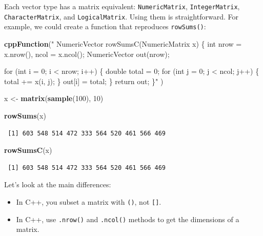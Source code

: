 \documentclass[
]{krantz}
\makeatletter
\newenvironment{Shaded}{\begin{snugshade}}{\end{snugshade}}
\newcommand{\DecValTok}[1]{\textcolor[rgb]{0.06,0.06,0.06}{#1}}
\newcommand{\KeywordTok}[1]{\textcolor[rgb]{0.27,0.27,0.27}{\textbf{#1}}}
\newcommand{\NormalTok}[1]{#1}
\newcommand{\StringTok}[1]{\textcolor[rgb]{0.5,0.5,0.5}{#1}}
\providecommand{\tightlist}{%
  \setlength{\itemsep}{0pt}\setlength{\parskip}{0pt}}
\newenvironment{kframe}{%
\medskip{}
\setlength{\fboxsep}{.8em}
 \def\at@end@of@kframe{}%
 \ifinner\ifhmode%
  \def\at@end@of@kframe{\end{minipage}}%
  \begin{minipage}{\columnwidth}%
 \fi\fi%
 \def\FrameCommand##1{\hskip\@totalleftmargin \hskip-\fboxsep
 \colorbox{shadecolor}{##1}\hskip-\fboxsep
     \hskip-\linewidth \hskip-\@totalleftmargin \hskip\columnwidth}%
 \MakeFramed {\advance\hsize-\width
   \@totalleftmargin\z@ \linewidth\hsize
   \@setminipage}}%
 {\par\unskip\endMakeFramed%
 \at@end@of@kframe}
\renewenvironment{Shaded}{\begin{kframe}}{\end{kframe}}
\makeatother
\begin{document}
Each vector type has a matrix equivalent: \texttt{NumericMatrix}, \texttt{IntegerMatrix}, \texttt{CharacterMatrix}, and \texttt{LogicalMatrix}. Using them is straightforward. For example, we could create a function that reproduces \texttt{rowSums()}:

\begin{Shaded}
\begin{Highlighting}[]
\KeywordTok{cppFunction}\NormalTok{(}\StringTok{"}
\StringTok{  NumericVector rowSumsC(NumericMatrix x) \{}
\StringTok{    int nrow = x.nrow(), ncol = x.ncol();}
\StringTok{    NumericVector out(nrow);}

\StringTok{    for (int i = 0; i \textless{} nrow; i++) \{}
\StringTok{      double total = 0;}
\StringTok{      for (int j = 0; j \textless{} ncol; j++) \{}
\StringTok{        total += x(i, j);}
\StringTok{      \}}
\StringTok{      out[i] = total;}
\StringTok{    \}}
\StringTok{    return out;}
\StringTok{  \}"}
\NormalTok{)}

\NormalTok{x \textless{}{-}}\StringTok{ }\KeywordTok{matrix}\NormalTok{(}\KeywordTok{sample}\NormalTok{(}\DecValTok{100}\NormalTok{), }\DecValTok{10}\NormalTok{)}

\KeywordTok{rowSums}\NormalTok{(x)}
\end{Highlighting}
\end{Shaded}

\begin{verbatim}
 [1] 603 548 514 472 333 564 520 461 566 469
\end{verbatim}

\begin{Shaded}
\begin{Highlighting}[]
\KeywordTok{rowSumsC}\NormalTok{(x)}
\end{Highlighting}
\end{Shaded}

\begin{verbatim}
 [1] 603 548 514 472 333 564 520 461 566 469
\end{verbatim}

Let's look at the main differences:

\begin{itemize}
\tightlist
\item
  In C++, you subset a matrix with \texttt{()}, not \texttt{{[}{]}}.
\item
  In C++, use \texttt{.nrow()} and \texttt{.ncol()} methods to get the dimensions of a matrix.
\end{itemize}
\end{document}
